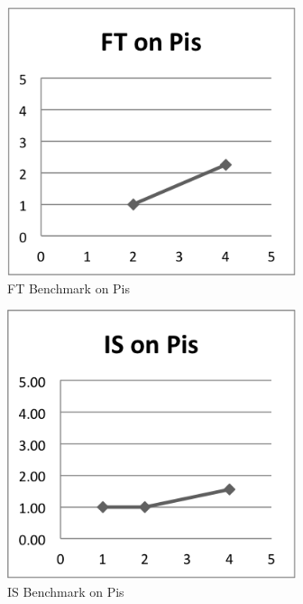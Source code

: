 \documentclass{acm_proc_article-sp}
\begin{document}
\begin{figure}[tbp]
  \centering
  \caption{FT Benchmark on Pis}
	\label{PiFT}
  \includegraphics[width=20pc]{Pics-Pi/FT.png}
\end{figure}

\begin{figure}[tbp]
  \centering
  \caption{IS Benchmark on Pis}
	\label{PiIS}
  \includegraphics[width=20pc]{Pics-Pi/IS.png}
\end{figure}
\end{document}
